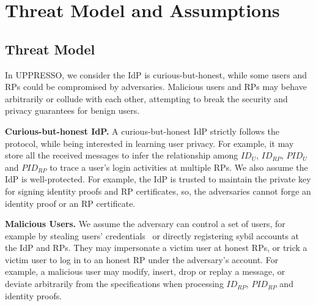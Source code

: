 \section{Threat Model and Assumptions}
\label{sec:assumptionandthreatmodel}


\subsection{Threat Model}
In UPPRESSO, we consider the IdP is curious-but-honest, while some users and RPs could be compromised by adversaries. %
Malicious users and RPs may behave arbitrarily or collude with each other, attempting to break the security and privacy guarantees for benign users.

\noindent \textbf{Curious-but-honest IdP.}
A curious-but-honest IdP strictly follows the protocol, while being interested in learning user privacy.  %
For example, it may store all the received messages to infer the relationship among $ID_U$, $ID_{RP}$, $PID_{U}$ and $PID_{RP}$ to trace a user's login activities at multiple RPs. We also assume the IdP is well-protected. %
For example, the IdP is trusted to maintain the private key for signing identity proofs and RP certificates, %
so, the adversaries cannot forge an identity proof or an RP certificate.


\noindent \textbf{Malicious Users.}
We assume the adversary can control a set of users, for example by stealing users' credentials~\cite{WangZWYH16, SunCL12} or directly registering sybil accounts at the IdP and RPs.
They may impersonate a victim user at honest RPs, or trick a victim user to log in to an honest RP under the adversary's account.
For example, a malicious user may %
modify, insert, drop or replay a message, or deviate arbitrarily from the specifications when processing $ID_{RP}$, $PID_{RP}$ and identity proofs.

